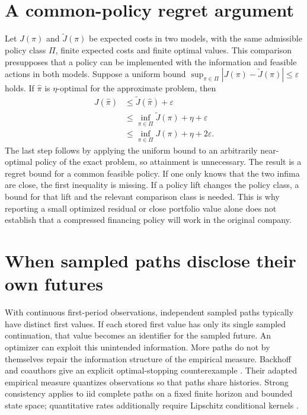 \section{A common-policy regret argument}
Let $J(\pi)$ and $\widetilde J(\pi)$ be expected costs in two models, with
the same admissible policy class $\Pi$, finite expected costs and finite optimal values. This comparison presupposes that a
policy can be implemented with the information and feasible actions in both
models. Suppose a uniform bound
$\sup_{\pi\in\Pi}|J(\pi)-\widetilde J(\pi)|\leq\varepsilon$ holds.
If $\widehat\pi$ is $\eta$-optimal for the approximate problem, then
\begin{align}
J(\widehat\pi)&\leq\widetilde J(\widehat\pi)+\varepsilon\nonumber\\
&\leq\inf_{\pi\in\Pi}\widetilde J(\pi)+\eta+\varepsilon\nonumber\\
&\leq\inf_{\pi\in\Pi}J(\pi)+\eta+2\varepsilon.
\end{align}
The last step follows by applying the uniform bound to an arbitrarily
near-optimal policy of the exact problem, so attainment is unnecessary.
The result is a regret bound for a common feasible policy. If one only knows
that the two infima are close, the first inequality is missing. If a policy
lift changes the policy class, a bound for that lift and the relevant comparison
class is needed. This is why reporting a small optimized residual or close
portfolio value alone does not establish that a compressed financing policy
will work in the original company.

\section{When sampled paths disclose their own futures}
With continuous first-period observations, independent sampled paths typically
have distinct first values. If each stored first value has only its single
sampled continuation, that value becomes an identifier for the sampled future.
An optimizer can exploit this unintended information. More paths do not by
themselves repair the information structure of the empirical measure.
Backhoff and coauthors give an explicit optimal-stopping counterexample
\cite[Example~7.1]{litcloseestimation}. Their adapted empirical measure quantizes
observations so that paths share histories. Strong consistency applies to
iid complete paths on a fixed finite horizon and bounded state space;
quantitative rates additionally require Lipschitz conditional kernels
\cite[Definitions~1.1--1.2, Theorems~1.3, 1.5, 1.7]{litcloseestimation}.

